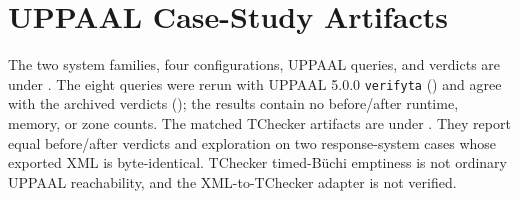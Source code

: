 \documentclass{ieeeaccess}
\begin{document}
\section{UPPAAL Case-Study Artifacts}
The two system families, four configurations, UPPAAL queries, and verdicts are under . The eight queries were rerun with UPPAAL 5.0.0 \texttt{verifyta} () and agree with the archived verdicts (); the results contain no before/after runtime, memory, or zone counts. The matched TChecker artifacts are under . They report equal before/after verdicts and exploration on two response-system cases whose exported XML is byte-identical. TChecker timed-B\"uchi emptiness is not ordinary UPPAAL reachability, and the XML-to-TChecker adapter is not verified.



\EOD
\end{document}
